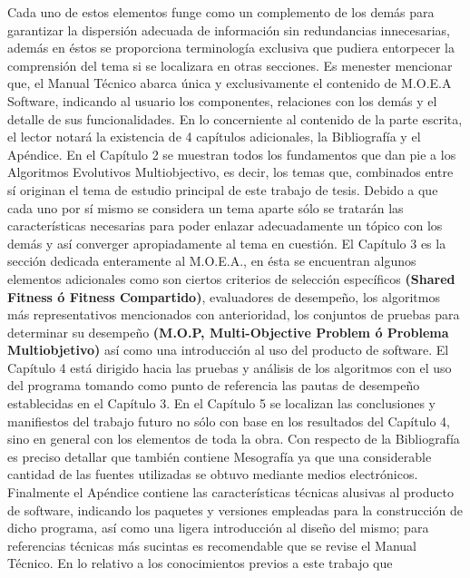 \documentclass[class=report, crop=false]{standalone}
\begin{document}
Cada uno de estos elementos funge como un complemento de los 
demás para garantizar la dispersión adecuada de información 
sin redundancias innecesarias, además en éstos se proporciona 
terminología exclusiva que pudiera entorpecer la comprensión 
del tema si se localizara en otras secciones.\medskip\break
Es menester mencionar que, el Manual Técnico abarca única 
y exclusivamente el contenido de M.O.E.A Software, indicando 
al usuario los componentes, relaciones con los demás y el 
detalle de sus funcionalidades.\medskip\break
En lo concerniente al contenido de la parte escrita, el lector 
notará la existencia de 4 capítulos adicionales, la Bibliografía 
y el Apéndice.\break
En el Capítulo 2 se muestran todos los fundamentos que dan pie 
a los Algoritmos Evolutivos Multiobjectivo, es decir, los temas 
que, combinados entre sí originan el tema de estudio principal 
de este trabajo de tesis.\break
Debido a que cada uno por sí mismo se considera un tema aparte 
sólo se tratarán las características necesarias para poder 
enlazar adecuadamente un tópico con los demás y así converger 
apropiadamente al tema en cuestión.\medskip\break
El Capítulo 3 es la sección dedicada enteramente al M.O.E.A., 
en ésta se encuentran algunos elementos adicionales como 
son ciertos criterios de selección específicos \textbf{(Shared Fitness ó Fitness Compartido)}, 
evaluadores de desempeño, los algoritmos más representativos 
mencionados con anterioridad, los conjuntos de pruebas 
para determinar su desempeño \textbf{(M.O.P, Multi-Objective Problem ó Problema Multiobjetivo)}
así como una introducción al uso del producto de software.\medskip\break
El Capítulo 4 está dirigido hacia las pruebas y análisis de 
los algoritmos con el uso del programa tomando como punto de 
referencia las pautas de desempeño establecidas en el Capítulo 3.\medskip\break
En el Capítulo 5 se localizan las conclusiones y manifiestos 
del trabajo futuro no sólo con base en los resultados del 
Capítulo 4, sino en general con los elementos de toda la obra.\medskip\break
Con respecto de la Bibliografía es preciso detallar que también 
contiene Mesografía ya que una considerable cantidad de las 
fuentes utilizadas se obtuvo mediante medios electrónicos.\medskip\break
Finalmente el Apéndice contiene las características técnicas 
alusivas al producto de software, indicando los paquetes y 
versiones empleadas para la construcción de dicho programa, 
así como una ligera introducción al diseño del mismo; para 
referencias técnicas más sucintas es recomendable que se 
revise el Manual Técnico.\medskip\break
En lo relativo a los conocimientos previos a este trabajo que 
\end{document}

